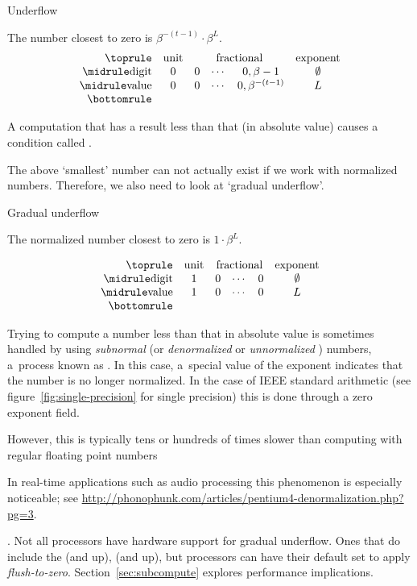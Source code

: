  {Underflow}

The number closest to zero is $\beta^{-(t-1)}\cdot \beta^L$.
\begin{equation}
\begin{array}{rccccc}
  \toprule
  &\textrm{unit}&\multicolumn{3}{c}{\textrm{fractional}}&\textrm{exponent}\\
  \midrule
  \textrm{digit}&0&0&\cdots&0,\beta-1&\emptyset\\
  \midrule
  \textrm{value}&0&0&\cdots&0,\beta^{-(t-1)}&L\\
  \bottomrule
\end{array}
\end{equation}

A computation that has a result less than that
(in absolute value) causes a condition called . 

The above `smallest' number can not actually exist if we work with
normalized numbers.
Therefore, we also need to look at `gradual underflow'.

 {Gradual underflow}
\label{sec:underflow}

The normalized number closest to zero is $1\cdot \beta^L$.

\begin{equation}
\begin{array}{rccccc}
  \toprule
  &\textrm{unit}&\multicolumn{3}{c}{\textrm{fractional}}&\textrm{exponent}\\
  \midrule
  \textrm{digit}& 1& 0&\cdots&0&\emptyset\\
  \midrule
  \textrm{value}& 1& 0&\cdots&0&L\\
  \bottomrule
\end{array}
\end{equation}

Trying
to compute a number less than that in absolute value is sometimes
handled by using
\emph{subnormal}
(or \emph{denormalized}%
or \emph{unnormalized}%
%
) numbers,
a~process known as .
In this case, a~special
value of the exponent indicates that the number is no longer normalized.
In the case of IEEE standard arithmetic
(see figure~\ref{fig:single-precision} for single precision)
this is done through a zero exponent field.

However, this is typically tens or hundreds of times slower than
computing with regular floating point numbers
\begin{footnoteenv}
  {In real-time
applications such as audio processing this phenomenon is especially
noticeable;
see
\url{http://phonophunk.com/articles/pentium4-denormalization.php?pg=3}.}
\end{footnoteenv}
. 
Not all processors have hardware support for gradual underflow.
Ones that do include the  (and up),
 (and up), but
processors can have their default set to apply
\emph{flush-to-zero}.
Section~\ref{sec:subcompute} explores performance implications.

